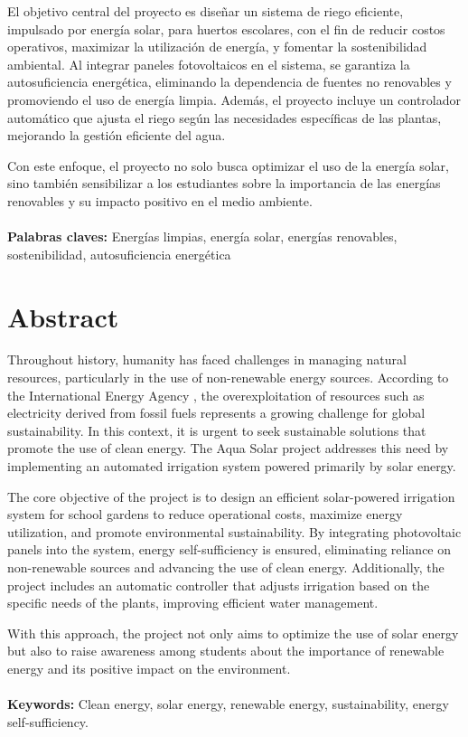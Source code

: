 \documentclass[12pt]{article}
\begin{document}
El objetivo central del proyecto es diseñar un sistema de riego eficiente, impulsado por energía solar, para huertos escolares, con el fin de reducir costos operativos, maximizar la utilización de energía, y fomentar la sostenibilidad ambiental. Al integrar paneles fotovoltaicos en el sistema, se garantiza la autosuficiencia energética, eliminando la dependencia de fuentes no renovables y promoviendo el uso de energía limpia. Además, el proyecto incluye un controlador automático que ajusta el riego según las necesidades específicas de las plantas, mejorando la gestión eficiente del agua.

Con este enfoque, el proyecto no solo busca optimizar el uso de la energía solar, sino también sensibilizar a los estudiantes sobre la importancia de las energías renovables y su impacto positivo en el medio ambiente.
\\~\\
\textbf{Palabras claves:} Energías limpias, energía solar, energías renovables, sostenibilidad, autosuficiencia energética
\newpage
\section*{Abstract}
Throughout history, humanity has faced challenges in managing natural resources, particularly in the use of non-renewable energy sources. According to the International Energy Agency \cite{IEA2020}, the overexploitation of resources such as electricity derived from fossil fuels represents a growing challenge for global sustainability. In this context, it is urgent to seek sustainable solutions that promote the use of clean energy. The Aqua Solar project addresses this need by implementing an automated irrigation system powered primarily by solar energy.

The core objective of the project is to design an efficient solar-powered irrigation system for school gardens to reduce operational costs, maximize energy utilization, and promote environmental sustainability. By integrating photovoltaic panels into the system, energy self-sufficiency is ensured, eliminating reliance on non-renewable sources and advancing the use of clean energy. Additionally, the project includes an automatic controller that adjusts irrigation based on the specific needs of the plants, improving efficient water management.

With this approach, the project not only aims to optimize the use of solar energy but also to raise awareness among students about the importance of renewable energy and its positive impact on the environment.
\\~\\
\textbf{Keywords:} Clean energy, solar energy, renewable energy, sustainability, energy self-sufficiency.
\newpage
\renewcommand{\contentsname}{\hfill\bfseries\Large Tabla de Contenido\hfill}
\tableofcontents
\end{document}
